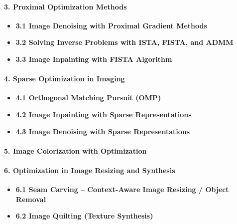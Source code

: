 \documentclass[11pt]{article}
\providecommand{\tightlist}{%
      \setlength{\itemsep}{0pt}\setlength{\parskip}{0pt}}
\begin{document}
\hypertarget{proximal-optimization-methods}{%
\paragraph{3. Proximal Optimization
Methods}\label{proximal-optimization-methods}}

\begin{itemize}
\tightlist
\item
  \textbf{3.1 Image Denoising with Proximal Gradient Methods}
\item
  \textbf{3.2 Solving Inverse Problems with ISTA, FISTA, and ADMM}
\item
  \textbf{3.3 Image Inpainting with FISTA Algorithm}
\end{itemize}

\hypertarget{sparse-optimization-in-imaging}{%
\paragraph{4. Sparse Optimization in
Imaging}\label{sparse-optimization-in-imaging}}

\begin{itemize}
\tightlist
\item
  \textbf{4.1 Orthogonal Matching Pursuit (OMP)}
\item
  \textbf{4.2 Image Inpainting with Sparse Representations}
\item
  \textbf{4.3 Image Denoising with Sparse Representations}
\end{itemize}

\hypertarget{image-colorization-with-optimization}{%
\paragraph{5. Image Colorization with
Optimization}\label{image-colorization-with-optimization}}

\hypertarget{optimization-in-image-resizing-and-synthesis}{%
\paragraph{6. Optimization in Image Resizing and
Synthesis}\label{optimization-in-image-resizing-and-synthesis}}

\begin{itemize}
\tightlist
\item
  \textbf{6.1 Seam Carving -- Context-Aware Image Resizing / Object
  Removal}
\item
  \textbf{6.2 Image Quilting (Texture Synthesis)}
\end{itemize}
\end{document}
